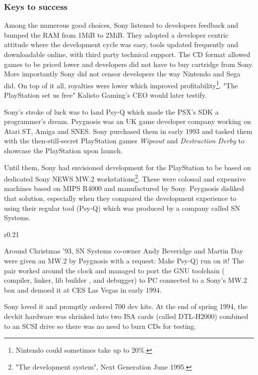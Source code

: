 
\vspace{-10pt}
\subsubsection{Keys to success}
\par
 Among the numerous good choices, Sony listened to developers feedback and bumped the RAM from 1MiB to 2MiB.  They adopted a developer centric attitude where the development cycle was easy, tools updated frequently and downloadable online, with third party technical support. The CD format allowed games to be priced lower and developers did not have to buy cartridge from Sony. More importantly Sony did not censor developers the way Nintendo and Sega did. On top of it all, royalties were lower which improved profitability\footnote{Nintendo could sometimes take up to 20\%.}. "The PlayStation set us free" Kalisto Gaming's CEO would later testify.\\
\par
Sony's stroke of luck was to land Psy-Q which made the PSX's SDK a programmer's dream. Psygnosis was an UK game developer company working on Atari ST, Amiga and SNES. Sony purchased them in early 1993 and tasked them with the then-still-secret PlayStation games \textit{Wipeout} and \textit{Destruction Derby} to showcase the PlayStation upon launch.\\
\par
Until them, Sony had envisioned development for the PlayStation to be based on dedicated Sony NEWS MW.2 workstations\footnote{"The development system", Next Generation June 1995.}. These were colossal and expensive machines based on MIPS R4000 and manufactured by Sony. Psygnosis disliked that solution, especially when they compared the development experience to using their regular tool (Psy-Q) which was produced by a company called SN Systems.\\
\par
\begin{wrapfigure}[10]{r}{0.21\textwidth}{
\centering {}}
\end{wrapfigure}
Around Christmas '93, SN Systems co-owner Andy Beveridge and Martin Day were given an MW.2 by Psygnosis with a request: Make Psy-Q) run on it! The pair worked around the clock and managed to port the GNU toolchain ( compiler,  linker, lib builder , and  debugger) to PC connected to a Sony's MW.2 box and demoed it at CES Las Vegas in early 1994.\\
\par
 Sony loved it and promptly ordered 700 dev kits. At the end of spring 1994, the devkit hardware was shrinked into two ISA cards (called DTL-H2000) combined to an SCSI drive so there was no need to burn CDs for testing.\\

